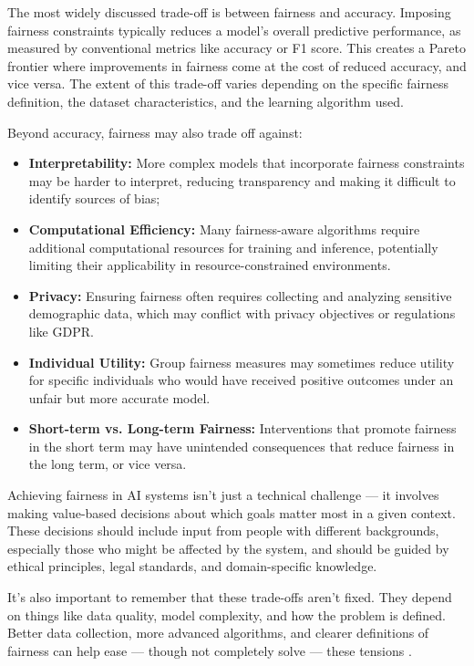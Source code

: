 \documentclass[12pt,a4paper,openright,twoside]{book}
\begin{document}
The most widely discussed trade-off is between fairness and accuracy. Imposing fairness constraints typically reduces a model's overall predictive performance, as measured by conventional metrics like accuracy or F1 score. This creates a Pareto frontier where improvements in fairness come at the cost of reduced accuracy, and vice versa. The extent of this trade-off varies depending on the specific fairness definition, the dataset characteristics, and the learning algorithm used.

Beyond accuracy, fairness may also trade off against:

\begin{itemize}
    \item \textbf{Interpretability:} More complex models that incorporate fairness constraints may be harder to interpret, reducing transparency and making it difficult to identify sources of bias;
    
    \item \textbf{Computational Efficiency:} Many fairness-aware algorithms require additional computational resources for training and inference, potentially limiting their applicability in resource-constrained environments.
    
    \item \textbf{Privacy:} Ensuring fairness often requires collecting and analyzing sensitive demographic data, which may conflict with privacy objectives or regulations like GDPR.
    
    \item \textbf{Individual Utility:} Group fairness measures may sometimes reduce utility for specific individuals who would have received positive outcomes under an unfair but more accurate model.
    
    \item \textbf{Short-term vs. Long-term Fairness:} Interventions that promote fairness in the short term may have unintended consequences that reduce fairness in the long term, or vice versa.
\end{itemize}

Achieving fairness in AI systems isn’t just a technical challenge — it involves making value-based decisions about which goals matter most in a given context. These decisions should include input from people with different backgrounds, especially those who might be affected by the system, and should be guided by ethical principles, legal standards, and domain-specific knowledge.

It’s also important to remember that these trade-offs aren’t fixed. They depend on things like data quality, model complexity, and how the problem is defined. Better data collection, more advanced algorithms, and clearer definitions of fairness can help ease — though not completely solve — these tensions \cite{kusner2017counterfactual, chouldechova2020snapshot}.
\end{document}
